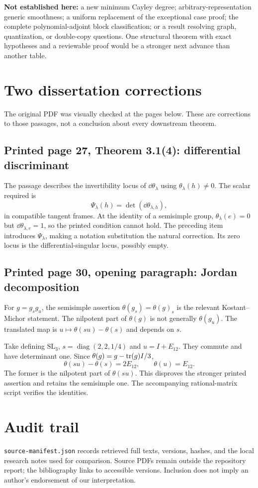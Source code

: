\textbf{Not established here:} a new minimum Cayley degree; arbitrary-representation generic smoothness; a uniform replacement of the exceptional case proof; the complete polynomial-adjoint block classification; or a result resolving graph, quantization, or double-copy questions. One structural theorem with exact hypotheses and a reviewable proof would be a stronger next advance than another table.

\appendix
\section{Two dissertation corrections}\label{sec:errata}
The original PDF was visually checked at the pages below. These are corrections to those passages, not a conclusion about every downstream theorem.
\subsection{Printed page 27, Theorem 3.1(4): differential discriminant}
The passage describes the invertibility locus of $\dd\theta_\lambda$ using $\theta_\lambda(h)\ne0$. The scalar required is
\[
\Psi_\lambda(h)=\det(\dd\theta_{\lambda,h}),
\]
in compatible tangent frames. At the identity of a semisimple group, $\theta_\lambda(e)=0$ but $\dd\theta_{\lambda,e}=1$, so the printed condition cannot hold. The preceding item introduces $\Psi_\lambda$, making a notation substitution the natural correction. Its zero locus is the differential-singular locus, possibly empty.

\subsection{Printed page 30, opening paragraph: Jordan decomposition}
For $g=g_sg_u$, the semisimple assertion $\theta(g_s)=\theta(g)_s$ is the relevant Kostant--Michor statement. The nilpotent part of $\theta(g)$ is not generally $\theta(g_u)$. The translated map is $u\mapsto\theta(su)-\theta(s)$ and depends on $s$.

Take defining $\mathrm{SL}_3$, $s=\operatorname{diag}(2,2,1/4)$ and $u=I+E_{12}$. They commute and have determinant one. Since $\theta(g)=g-\operatorname{tr}(g)I/3$,
\[
\theta(su)-\theta(s)=2E_{12},\qquad \theta(u)=E_{12}.
\]
The former is the nilpotent part of $\theta(su)$. This disproves the stronger printed assertion and retains the semisimple one. The accompanying rational-matrix script verifies the identities.

\section{Audit trail}
\nolinkurl{source-manifest.json} records retrieved full texts, versions, hashes, and the local research notes used for comparison. Source PDFs remain outside the repository report; the bibliography links to accessible versions. Inclusion does not imply an author's endorsement of our interpretation.

